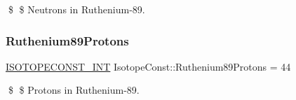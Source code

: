 \$ \$ Neutrons in Ruthenium-\/89. \mbox{\label{group___isotope_const-_ruthenium-_ru89_gaef5ae25256e875dc4ad3ab60cf710efb}} 
\subsubsection{\texorpdfstring{Ruthenium89\+Protons}{Ruthenium89Protons}}
{\footnotesize\ttfamily \mbox{\hyperlink{group___isotope_const-_macros_ga5f18360b3e99483a35c32d789e62621c}{I\+S\+O\+T\+O\+P\+E\+C\+O\+N\+S\+T\+\_\+\+I\+NT}} Isotope\+Const\+::\+Ruthenium89\+Protons = 44}

\$ \$ Protons in Ruthenium-\/89. 